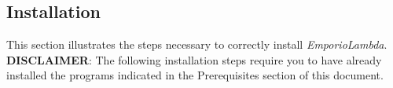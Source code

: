 \subsection{Installation}
This section illustrates the steps necessary to correctly install \textit{EmporioLambda}.\\
\textbf{DISCLAIMER}: The following installation steps require you to have already installed the programs indicated in the Prerequisites section of this document.



